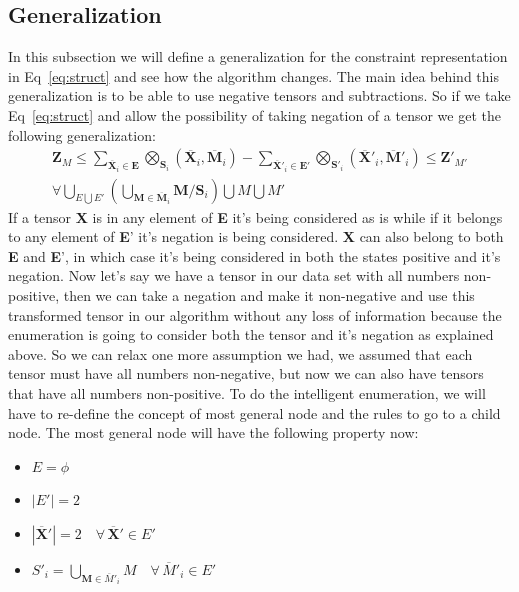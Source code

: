 \documentclass{article}
\newcommand{\TX}{\textbf{X}\xspace}
\newcommand{\TZ}{\textbf{Z}\xspace}
\newcommand{\TM}{\textbf{M}\xspace}
\newcommand{\TE}{\textbf{E}\xspace}
\begin{document}
\subsection{Generalization}
In this subsection we will define a generalization for the constraint representation in Eq~\ref{eq:struct} and see how the algorithm changes. The main idea behind this generalization is to be able to use negative tensors and subtractions. So if we take Eq~\ref{eq:struct} and allow the possibility of taking negation of a tensor we get the following generalization:
\begin{multline}
\label{eq:genStruct}
	\displaystyle\TZ_{M} \le \sum\limits_{\overline{\TX}_i \in \TE}\bigotimes_{\textbf{S}_i}(\overline{\TX}_i,\overline{\TM}_i) - 
	\sum\limits_{\overline{\TX}'_i \in \TE'}\bigotimes_{\textbf{S}'_i}(\overline{\TX}'_i,\overline{\TM}'_i) \le \TZ'_{M'}\\ \forall \bigcup_{E \bigcup E'}(\bigcup_{\TM \in \overline{\TM}_i} \TM / \textbf{S}_i) \bigcup M  \bigcup M' 
\end{multline}
If a tensor \TX is in any element of \TE it's being considered as is while if it belongs to any element of \TE' it's negation is being considered. \TX can also belong to both \TE and \TE', in which case it's being considered in both the states positive and it's negation. 
Now let's say we have a tensor in our data set with all numbers non-positive, then we can take a negation and make it non-negative and use this transformed tensor in our algorithm without any loss of information because the enumeration is going to consider both the tensor and it's negation as explained above.
So we can relax one more assumption we had, we assumed that each tensor must have all numbers non-negative, but now we can also have tensors that have all numbers non-positive. To do the intelligent enumeration, we will have to re-define the concept of most general node and the rules to go to a child node.
The most general node will have the following property now:
\begin{itemize}
\item $E=\phi$
\item $|E'|=2$
\item $|\overline{\TX}'|=2 \quad \forall \, \overline{\TX}' \in E'$ 
\item $\displaystyle S'_i = \bigcup_{\TM \in \overline{M}'_i} M \quad \forall \, \overline{M}'_i \in E'$
\end{itemize}
\end{document}

